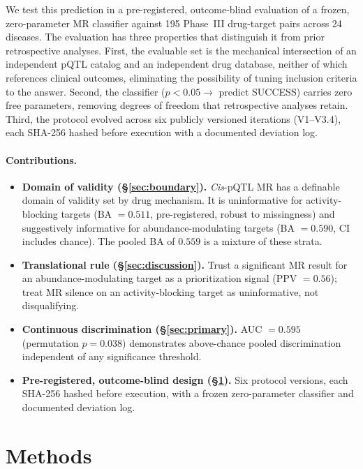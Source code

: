 \documentclass[11pt]{article}
\begin{document}
We test this prediction in a pre-registered, outcome-blind evaluation of a frozen, zero-parameter MR classifier against 195 Phase~III drug-target pairs across 24 diseases. The evaluation has three properties that distinguish it from prior retrospective analyses. First, the evaluable set is the mechanical intersection of an independent pQTL catalog and an independent drug database, neither of which references clinical outcomes, eliminating the possibility of tuning inclusion criteria to the answer. Second, the classifier ($p < 0.05 \rightarrow$ predict SUCCESS) carries zero free parameters, removing degrees of freedom that retrospective analyses retain. Third, the protocol evolved across six publicly versioned iterations (V1--V3.4), each SHA-256 hashed before execution with a documented deviation log.

\paragraph{Contributions.}
\begin{itemize}
\item \textbf{Domain of validity (\S\ref{sec:boundary}).} \emph{Cis}-pQTL MR has a definable domain of validity set by drug mechanism. It is uninformative for activity-blocking targets (BA $= 0.511$, pre-registered, robust to missingness) and suggestively informative for abundance-modulating targets (BA $= 0.590$, CI includes chance). The pooled BA of $0.559$ is a mixture of these strata.
\item \textbf{Translational rule (\S\ref{sec:discussion}).} Trust a significant MR result for an abundance-modulating target as a prioritization signal (PPV $= 0.56$); treat MR silence on an activity-blocking target as uninformative, not disqualifying.
\item \textbf{Continuous discrimination (\S\ref{sec:primary}).} AUC $= 0.595$ (permutation $p = 0.038$) demonstrates above-chance pooled discrimination independent of any significance threshold.
\item \textbf{Pre-registered, outcome-blind design (\S\ref{sec:methods}).} Six protocol versions, each SHA-256 hashed before execution, with a frozen zero-parameter classifier and documented deviation log.
\end{itemize}

\section{Methods}
\label{sec:methods}
\end{document}
